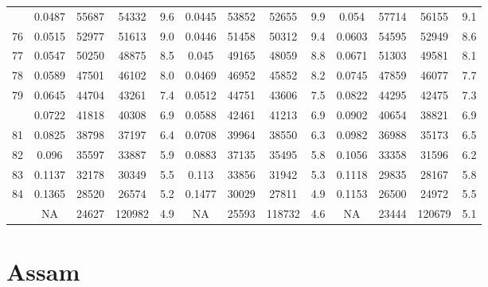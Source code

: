 \documentclass[
  14pt,
]{article}
\begin{document}
\begin{longtable}[t]{lcccccccccccc}
\addlinespace
75 & 0.0487 & 55687 & 54332 & 9.6 & 0.0445 & 53852 & 52655 & 9.9 & 0.054 & 57714 & 56155 & 9.1\\
76 & 0.0515 & 52977 & 51613 & 9.0 & 0.0446 & 51458 & 50312 & 9.4 & 0.0603 & 54595 & 52949 & 8.6\\
77 & 0.0547 & 50250 & 48875 & 8.5 & 0.045 & 49165 & 48059 & 8.8 & 0.0671 & 51303 & 49581 & 8.1\\
78 & 0.0589 & 47501 & 46102 & 8.0 & 0.0469 & 46952 & 45852 & 8.2 & 0.0745 & 47859 & 46077 & 7.7\\
79 & 0.0645 & 44704 & 43261 & 7.4 & 0.0512 & 44751 & 43606 & 7.5 & 0.0822 & 44295 & 42475 & 7.3\\
\addlinespace
80 & 0.0722 & 41818 & 40308 & 6.9 & 0.0588 & 42461 & 41213 & 6.9 & 0.0902 & 40654 & 38821 & 6.9\\
81 & 0.0825 & 38798 & 37197 & 6.4 & 0.0708 & 39964 & 38550 & 6.3 & 0.0982 & 36988 & 35173 & 6.5\\
82 & 0.096 & 35597 & 33887 & 5.9 & 0.0883 & 37135 & 35495 & 5.8 & 0.1056 & 33358 & 31596 & 6.2\\
83 & 0.1137 & 32178 & 30349 & 5.5 & 0.113 & 33856 & 31942 & 5.3 & 0.1118 & 29835 & 28167 & 5.8\\
84 & 0.1365 & 28520 & 26574 & 5.2 & 0.1477 & 30029 & 27811 & 4.9 & 0.1153 & 26500 & 24972 & 5.5\\
\addlinespace
85 & NA & 24627 & 120982 & 4.9 & NA & 25593 & 118732 & 4.6 & NA & 23444 & 120679 & 5.1\\*
\end{longtable}

\pagebreak

\hypertarget{assam}{%
\section{Assam}\label{assam}}
\end{document}
